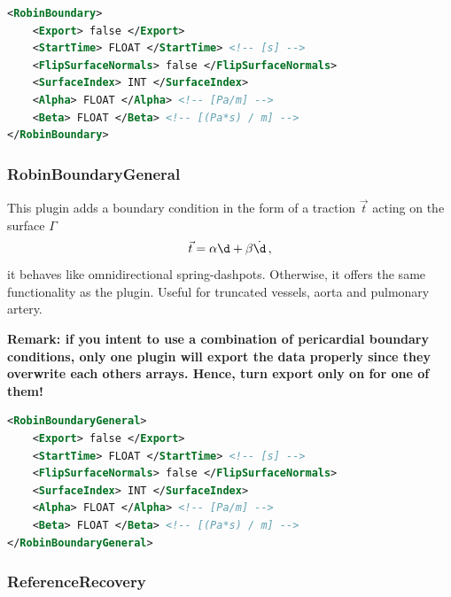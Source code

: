 \begin{lstlisting}[language=XML,caption=.xml settings for the RobinBoundary plugin]
<RobinBoundary>
    <Export> false </Export> 
    <StartTime> FLOAT </StartTime> <!-- [s] -->
    <FlipSurfaceNormals> false </FlipSurfaceNormals>
    <SurfaceIndex> INT </SurfaceIndex>
    <Alpha> FLOAT </Alpha> <!-- [Pa/m] -->
    <Beta> FLOAT </Beta> <!-- [(Pa*s) / m] -->
</RobinBoundary>
\end{lstlisting}

\subsubsection{RobinBoundaryGeneral}
\label{plugin:RobinGeneral}

This plugin adds a boundary condition in the form of a traction $\vec t$ acting on the surface $\Gamma$
\begin{equation}
    \vec t = \alpha \d + \beta \dot{\d} \,,
\end{equation}
\ie it behaves like omnidirectional spring-dashpots.
Otherwise, it offers the same functionality as the  plugin.
Useful for truncated vessels, \eg aorta and pulmonary artery.

\textbf{Remark: if you intent to use a combination of pericardial boundary conditions, only one plugin will export the data properly since they overwrite each others arrays. Hence, turn export only on for one of them!}

\begin{lstlisting}[language=XML,caption=.xml settings for the RobinBoundaryGeneral plugin]
<RobinBoundaryGeneral>
    <Export> false </Export> 
    <StartTime> FLOAT </StartTime> <!-- [s] -->
    <FlipSurfaceNormals> false </FlipSurfaceNormals>
    <SurfaceIndex> INT </SurfaceIndex>
    <Alpha> FLOAT </Alpha> <!-- [Pa/m] -->
    <Beta> FLOAT </Beta> <!-- [(Pa*s) / m] -->
</RobinBoundaryGeneral>
\end{lstlisting}

\subsubsection{ReferenceRecovery}
\label{plugin:ReferenceRecovery}

